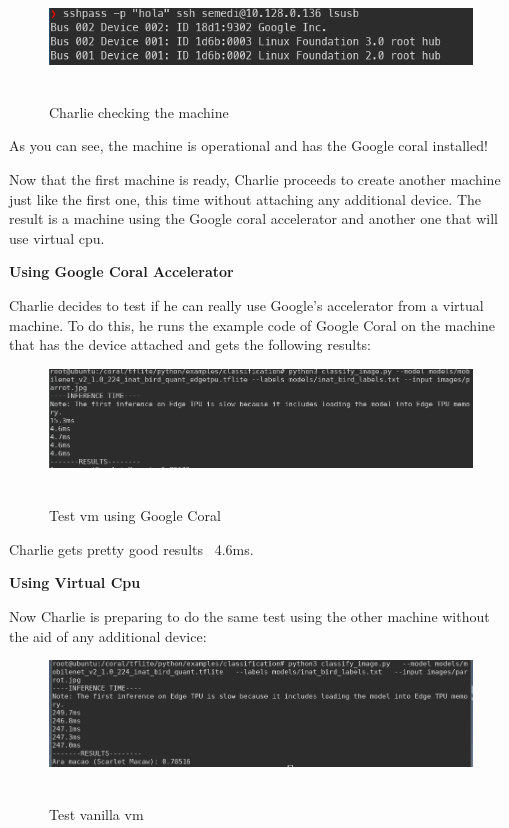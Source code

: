 \begin{figure}[h!]%
\centering
    \includegraphics[width=4.5in]{figures/attach_device_ls.png}
~\caption{Charlie checking the machine}
\label{figure6.7}
\end{figure}

As you can see, the machine is operational and has the Google coral installed!

Now that the first machine is ready, Charlie proceeds to create another machine just like the first one, this time without attaching any additional device.
The result is a machine using the Google coral accelerator and another one that will use virtual cpu.
\newpage

\textbf{Using Google Coral Accelerator}

Charlie decides to test if he can really use Google's accelerator from a virtual machine.
To do this, he runs the example code of Google Coral on the machine that has the device attached and gets the following results:

\begin{figure}[h!]%
\centering
    \includegraphics[width=6.5in]{figures/vm_dev_inference.png}
~\caption{Test vm using Google Coral}
\label{figure6.8}
\end{figure}

Charlie gets pretty good results ~4.6ms.

\textbf{Using Virtual Cpu}

Now Charlie is preparing to do the same test using the other machine without the aid of any additional device:

\begin{figure}[h!]%
\centering
    \includegraphics[width=6.5in]{figures/vm_nodev_inference.png}
~\caption{Test vanilla vm}
\label{figure6.9}
\end{figure}


